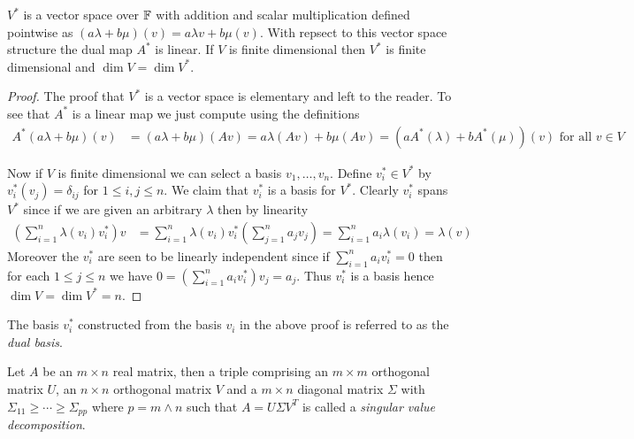 \begin{prop}$V^*$ is a vector space over $\mathbb{F}$ with addition and scalar multiplication defined pointwise as $(a\lambda + b\mu)(v) = a\lambda v + b \mu(v)$.  With repsect to this vector space structure the dual map $A^*$ is linear.  If $V$ is finite dimensional then $V^*$ is finite dimensional and $\dim V = \dim V^*$.
\end{prop}
\begin{proof}
The proof that $V^*$ is a vector space is elementary and left to the reader.  To see that $A^*$  is a linear map we just compute using the definitions
\begin{align*}
A^*( a \lambda + b \mu)(v) &= (a \lambda + b\mu)(Av) = a \lambda (Av) + b \mu (Av) = (a A^*(\lambda) + b A^*(\mu)) (v) \text{ for all $v \in V$}
\end{align*}

Now if $V$ is finite dimensional we can select a basis $v_1, \dotsc, v_n$.  Define $v_i^* \in V^*$ by $v_i^*(v_j) = \delta_{ij}$ for $1 \leq i,j \leq n$.  We claim that $v^*_i$ is a basis for $V^*$.  Clearly $v^*_i$ spans $V^*$ since if we are given an arbitrary $\lambda$ then by linearity
\begin{align*}
\left( \sum_{i=1}^n \lambda(v_i) v^*_i \right) v &= \sum_{i=1}^n \lambda(v_i) v^*_i (\sum_{j=1}^n a_j v_j) = \sum_{i=1}^n a_i \lambda(v_i) = \lambda(v)
\end{align*}
Moreover the $v^*_i$ are seen to be linearly independent since if $\sum_{i=1}^n a_i v^*_i = 0$ then for each $1 \leq j \leq n$ we have $0 = \left(\sum_{i=1}^n a_i v^*_i \right)v_j = a_j$.
Thus $v^*_i$ is a basis hence $\dim V  = \dim V^* = n$.
\end{proof}

The basis $v^*_i$ constructed from the basis $v_i$ in the above proof is referred to as the \emph{dual basis}.  

\begin{defn}Let $A$ be an $m \times n$ real matrix, then a triple comprising an $m \times m$ orthogonal matrix $U$, an $n \times n$ orthogonal matrix $V$ and a $m \times n$ diagonal matrix $\Sigma$ with $\Sigma_{11} \geq \dotsb \geq \Sigma_{pp}$ where $p = m \wedge n$ such that $A = U \Sigma V^T$ is called a \emph{singular value decomposition}.
\end{defn}

